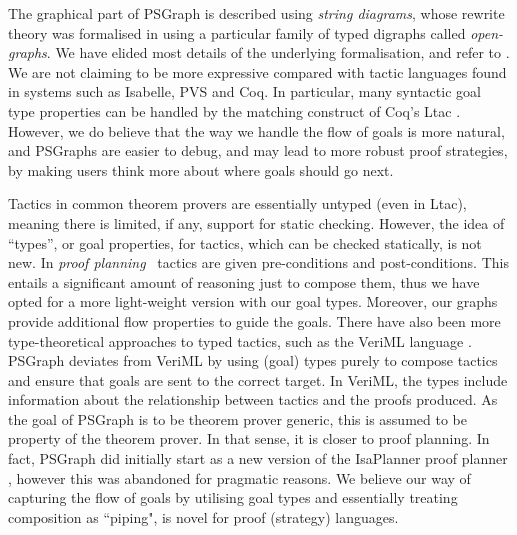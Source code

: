 \documentclass{llncs}
\begin{document}
The graphical part of PSGraph is described using \emph{string diagrams}, whose rewrite theory was formalised in \cite{paper:Dixon:10}
using a particular family of typed digraphs called \textit{open-graphs}. We have elided most details of the underlying formalisation, and refer to \cite{paper:Dixon:10}. We are not claiming to be more expressive compared with tactic languages found in systems such as Isabelle, PVS and Coq. In particular, many syntactic 
goal type properties can be handled by the matching construct of Coq's {\cal L}tac \cite{Delahaye02}. However, we do believe that the way we handle the flow of goals is more natural, and PSGraphs are easier to debug, and may lead to more robust proof strategies, by making users think more about where goals should go next.

Tactics in common theorem provers are essentially untyped (even in {\cal L}tac), meaning there is
limited, if any, support for static checking. However, the idea of ``types'', or goal properties, for tactics, which can be checked 
statically, is not new.  In  \emph{proof planning}~\cite{Bundy91} tactics are given pre-conditions and post-conditions. This entails a significant amount of reasoning just to compose them, thus we have opted for a more light-weight version with our goal types. Moreover, our graphs provide additional flow properties to guide the goals.  
There have also been more type-theoretical approaches to typed tactics,
such as the VeriML language \cite{Stampoulis10}. PSGraph deviates from VeriML by
using (goal) types purely to compose tactics and ensure that goals are sent to the correct target. In VeriML, the types include information about the relationship between tactics and the proofs produced. As the goal of PSGraph is to be theorem prover generic, this is assumed to be property of the theorem prover. In that sense, it is closer to proof planning. In fact, PSGraph did  initially start as a new version of the IsaPlanner proof planner \cite{paper:Dixon:03}, however this was abandoned for pragmatic reasons.
We believe our way of capturing the flow of goals by utilising goal types and 
essentially treating composition as ``piping", is novel for proof (strategy) languages.
\end{document}
